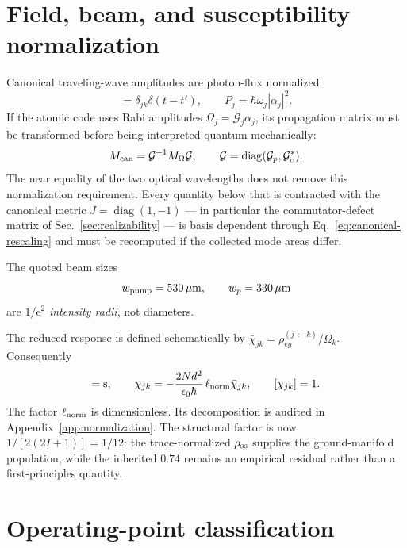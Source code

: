 \documentclass[11pt,a4paper]{article}
\newcommand{\e}{\mathrm e}
\newcommand{\chibar}{\bar\chi}
\begin{document}
\section{Field, beam, and susceptibility normalization}

Canonical traveling-wave amplitudes are photon-flux normalized:
\begin{equation}
[\delta\hat a_j(z,t),\delta\hat a_k^\dagger(z,t')]
=\delta_{jk}\delta(t-t'),\qquad
P_j=\hbar\omega_j|\alpha_j|^2 .
\label{eq:flux-normalization}
\end{equation}
If the atomic code uses Rabi amplitudes
$\Omega_j=\mathcal G_j\alpha_j$, its propagation matrix must be transformed
before being interpreted quantum mechanically:
\begin{equation}
M_{\rm can}=\mathcal G^{-1}M_{\Omega}\mathcal G,\qquad
\mathcal G=\operatorname{diag}(\mathcal G_p,\mathcal G_c^*).
\label{eq:canonical-rescaling}
\end{equation}
The near equality of the two optical wavelengths does not remove this
normalization requirement. Every quantity below that is contracted with the
canonical metric $J=\operatorname{diag}(1,-1)$ --- in particular the
commutator-defect matrix of Sec.~\ref{sec:realizability} --- is
basis dependent through Eq.~\eqref{eq:canonical-rescaling} and must be
recomputed if the collected mode areas differ.

The quoted beam sizes
\[
w_{\rm pump}=530\,\mu{\rm m},\qquad w_p=330\,\mu{\rm m}
\]
are $1/\e^2$ \emph{intensity radii}, not diameters.

The reduced response is defined schematically by
$\chibar_{jk}=\rho_{eg}^{(j\leftarrow k)}/\Omega_k$. Consequently
\begin{equation}
[\chibar_{jk}]={\rm s},\qquad
\chi_{jk}=-\frac{2Nd^2}{\epsilon_0\hbar}\,\ell_{\rm norm}\chibar_{jk},
\qquad [\chi_{jk}]=1 .
\label{eq:susceptibility-dimension}
\end{equation}
The factor $\ell_{\rm norm}$ is dimensionless. Its decomposition is audited
in Appendix~\ref{app:normalization}. The structural factor is now
$1/[2(2I+1)]=1/12$: the trace-normalized $\rho_{\rm ss}$ supplies the
ground-manifold population, while the inherited $0.74$ remains an empirical
residual rather than a first-principles quantity.

\section{Operating-point classification}
\end{document}
